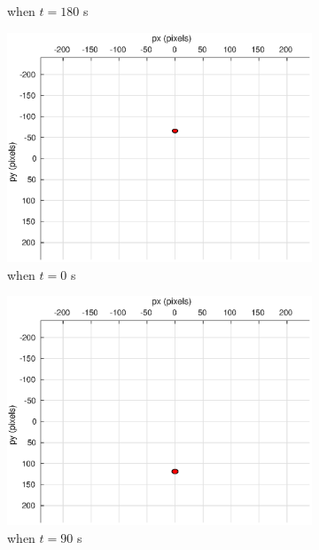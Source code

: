\begin{figure}[htbp]
\begin{subfigure}[t]{0.32\linewidth}
		\caption{when $t=180$ s}
	\end{subfigure}
	\begin{subfigure}[t]{0.32\linewidth}
		\includegraphics[width=\textwidth]{images/chapter4/image_camera_-5mps}
		\caption{when $t=0$ s}
	\end{subfigure}
	\begin{subfigure}[t]{0.32\linewidth}
		\includegraphics[width=\textwidth]{images/chapter4/image_camera_-5mps_90s}
		\caption{when $t=90$ s}
	\end{subfigure}
	\begin{subfigure}[t]{0.32\linewidth}

\end{subfigure}
\end{figure}
